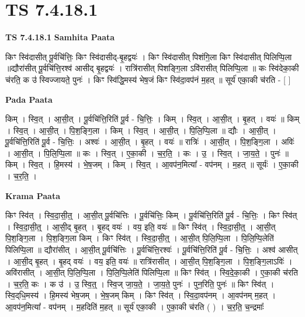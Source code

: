\documentclass[17pt]{extarticle}
\begin{document}
\section{ TS 7.4.18.1 }

\textbf{TS 7.4.18.1 } \newline
\textbf{Samhita Paata} \newline

किꣳ स्वि॑दासीत् पू॒र्वचि॑त्तिः॒ किꣳ स्वि॑दासीद्-बृ॒हद्वयः॑ । किꣳ स्वि॑दासीत् पिशंगि॒ला किꣳ स्वि॑दासीत् पिलिप्पि॒ला ॥द्यौरा॑सीत् पू॒र्वचि॑त्ति॒रश्व॑ आसीद् बृ॒हद्वयः॑ । रात्रि॑रासीत् पिशङ्गि॒ला ऽवि॑रासीत् पिलिप्पि॒ला ॥ कः स्वि॑देका॒की च॑रति॒ क उ॑ स्विज्जायते॒ पुनः॑ । किꣳ स्वि॑द्धि॒मस्य॑ भेष॒जं किꣳ स्वि॑दा॒वप॑नं म॒हत् ॥ सूर्य॑ एका॒की च॑रति - [  ] \newline

\textbf{Pada Paata} \newline

किम् । स्वि॒त् । आ॒सी॒त् । पू॒र्वचि॑त्ति॒रिति॑ पू॒र्व - चि॒त्तिः॒ । किम् । स्वि॒त् । आ॒सी॒त् । बृ॒हत् । वयः॑ ॥ किम् । स्वि॒त् । आ॒सी॒त् । पि॒श॒ङ्गि॒ला । किम् । स्वि॒त् । आ॒सी॒त् । पि॒लि॒प्पि॒ला ॥ द्यौः । आ॒सी॒त् । पू॒र्वचि॑त्ति॒रिति॑ पू॒र्व - चि॒त्तिः॒ । अश्वः॑ । आ॒सी॒त् । बृ॒हत् । वयः॑ ॥ रात्रिः॑ । आ॒सी॒त् । पि॒श॒ङ्गि॒ला । अविः॑ । आ॒सी॒त् । पि॒लि॒प्पि॒ला ॥ कः । स्वि॒त् । ए॒का॒की । च॒र॒ति॒ । कः । उ॒ । स्वि॒त् । जा॒य॒ते॒ । पुनः॑ ॥ किम् । स्वि॒त् । हि॒मस्य॑ । भे॒ष॒जम् । किम् । स्वि॒त् । आ॒वप॑न॒मित्या᳚ - वप॑नम् । म॒हत् ॥ सूर्यः॑ । ए॒का॒की । च॒र॒ति॒ ।  \newline


\textbf{Krama Paata} \newline

किꣳ स्वि॑त् । स्वि॒दा॒सी॒त्॒ । आ॒सी॒त् पू॒र्वचि॑त्तिः । पू॒र्वचि॑त्तिः॒ किम् । पू॒र्वचि॑त्ति॒रिति॑ पू॒र्व - चि॒त्तिः॒ । किꣳ स्वि॑त् । स्वि॒दा॒सी॒त्॒ । आ॒सी॒द् बृ॒हत् । बृ॒हद् वयः॑ । वय॒ इति॒ वयः॑ ॥ किꣳ स्वि॑त् । स्वि॒दा॒सी॒त्॒ । आ॒सी॒त् पि॒श॒ङ्‍गि॒ला । पि॒श॒ङ्‍गि॒ला किम् । किꣳ स्वि॑त् । स्वि॒दा॒सी॒त्॒ । आ॒सी॒त् पि॒लि॒प्पि॒ला । पि॒लि॒प्पि॒लेति॑ पिलिप्पि॒ला ॥ द्यौरा॑सीत् । आ॒सी॒त् पू॒र्वचि॑त्तिः । पू॒र्वचि॑त्ति॒रश्वः॑ । पू॒र्वचि॑त्ति॒रिति॑ पू॒र्व - चि॒त्तिः॒ । अश्व॑ आसीत् । आ॒सी॒द् बृ॒हत् । बृ॒हद् वयः॑ । वय॒ इति॒ वयः॑ ॥ रात्रि॑रासीत् । आ॒सी॒त् पि॒श॒ङ्‍गि॒ला । पि॒श॒ङ्‍गि॒लाऽविः॑ । अवि॑रासीत् । आ॒सी॒त् पि॒लि॒प्पि॒ला । पि॒लि॒प्पि॒लेति॑ पिलिप्पि॒ला ॥ किꣳ स्वि॑त् । स्वि॒दे॒का॒की । ए॒का॒की च॑रति । च॒र॒ति॒ कः । क उ॑ । उ॒ स्वि॒त्॒ । स्वि॒ज् जा॒य॒ते॒ । जा॒य॒ते॒ पुनः॑ । पुन॒रिति॒ पुनः॑ ॥ किꣳ स्वि॑त् । स्वि॒द्‌धि॒मस्य॑ । हि॒मस्य॑ भेष॒जम् । भे॒ष॒जम् किम् । किꣳ स्वि॑त् । स्वि॒दा॒वप॑नम् । आ॒वप॑नम् म॒हत् । आ॒वप॑न॒मित्या᳚ - वप॑नम् । म॒हदिति॑ म॒हत् ॥ सूर्य॑ एका॒की । ए॒का॒की च॑रति ( ) । च॒र॒ति॒ च॒न्द्रमाः᳚ \newline
\end{document}
